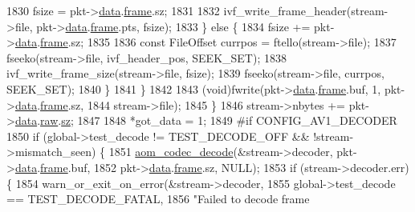 \begin{DoxyCodeInclude}
{{{{{{{{{{{{{{{{{{{{{{{{{{{{{{{{{{{{{{{{{{{1830             fsize = pkt->\hyperlink{structaom__codec__cx__pkt_afb379cd4bfa7692d1d6e85f4e4b2b410}{data}.\hyperlink{structaom__codec__cx__pkt_a4180a6ae59b0d295bc915d4689df4cb0}{frame}.sz;
1831 
1832             ivf\_write\_frame\_header(stream->file, pkt->\hyperlink{structaom__codec__cx__pkt_afb379cd4bfa7692d1d6e85f4e4b2b410}{data}.\hyperlink{structaom__codec__cx__pkt_a4180a6ae59b0d295bc915d4689df4cb0}{frame}.pts, fsize);
1833           \} \textcolor{keywordflow}{else} \{
1834             fsize += pkt->\hyperlink{structaom__codec__cx__pkt_afb379cd4bfa7692d1d6e85f4e4b2b410}{data}.\hyperlink{structaom__codec__cx__pkt_a4180a6ae59b0d295bc915d4689df4cb0}{frame}.sz;
1835 
1836             \textcolor{keyword}{const} FileOffset currpos = ftello(stream->file);
1837             fseeko(stream->file, ivf\_header\_pos, SEEK\_SET);
1838             ivf\_write\_frame\_size(stream->file, fsize);
1839             fseeko(stream->file, currpos, SEEK\_SET);
1840           \}
1841         \}
1842 
1843         (void)fwrite(pkt->\hyperlink{structaom__codec__cx__pkt_afb379cd4bfa7692d1d6e85f4e4b2b410}{data}.\hyperlink{structaom__codec__cx__pkt_a4180a6ae59b0d295bc915d4689df4cb0}{frame}.buf, 1, pkt->\hyperlink{structaom__codec__cx__pkt_afb379cd4bfa7692d1d6e85f4e4b2b410}{data}.\hyperlink{structaom__codec__cx__pkt_a4180a6ae59b0d295bc915d4689df4cb0}{frame}.sz,
1844             stream->file);
1845       \}
1846       stream->nbytes += pkt->\hyperlink{structaom__codec__cx__pkt_afb379cd4bfa7692d1d6e85f4e4b2b410}{data}.\hyperlink{structaom__codec__cx__pkt_a4fc6ea5e240c5df0acbf77aa2fe5ec6f}{raw}.\hyperlink{structaom__fixed__buf_a02f47e8b960c332c60a8aa4b7e37426f}{sz};
1847 
1848       *got\_data = 1;
1849 \textcolor{preprocessor}{#if CONFIG\_AV1\_DECODER}
1850       \textcolor{keywordflow}{if} (global->test\_decode != TEST\_DECODE\_OFF && !stream->mismatch\_seen) \{
1851         \hyperlink{group__decoder_gab03fdb999d1f83a5896869a3ba5f68f7}{aom\_codec\_decode}(&stream->decoder, pkt->\hyperlink{structaom__codec__cx__pkt_afb379cd4bfa7692d1d6e85f4e4b2b410}{data}.\hyperlink{structaom__codec__cx__pkt_a4180a6ae59b0d295bc915d4689df4cb0}{frame}.buf,
1852             pkt->\hyperlink{structaom__codec__cx__pkt_afb379cd4bfa7692d1d6e85f4e4b2b410}{data}.\hyperlink{structaom__codec__cx__pkt_a4180a6ae59b0d295bc915d4689df4cb0}{frame}.sz, NULL);
1853         \textcolor{keywordflow}{if} (stream->decoder.err) \{
1854           warn\_or\_exit\_on\_error(&stream->decoder,
1855               global->test\_decode == TEST\_DECODE\_FATAL,
1856               \textcolor{stringliteral}{"Failed to decode frame %
}}}}}}}}}}}}}}}}}}}}}}}}}}}}}}}}}}}}}}}}}}}}
\end{DoxyCodeInclude}
